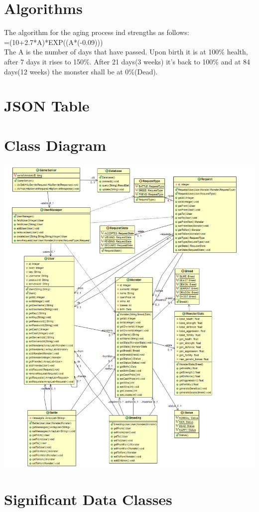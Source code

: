 \documentclass{project}
\begin{document}
\section{Algorithms}
The algorithm for the aging process ind strengths as follows:\\
=(10+2.7*A)*EXP((A*(-0.09)))\\
The A is the number of days that have passed. Upon birth it is at 100\% health, after 7 days it rises to 150\%. After 21 days(3 weeks) it's back to 100\% and at 84 days(12 weeks) the monster shall be at 0\%(Dead). 

\section{JSON Table}


\section{Class Diagram}
\includegraphics[scale=0.40]{MonsterDiagram.png}

\section{Significant Data Classes}
\end{document}
